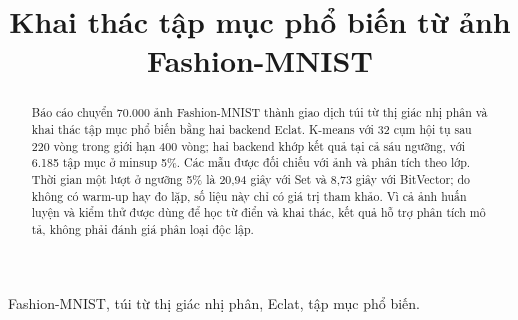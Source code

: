\documentclass[conference,a4paper]{IEEEtran}
\begin{document}
\raggedbottom
\title{Khai thác tập mục phổ biến từ ảnh Fashion-MNIST}
\author{
}
\maketitle

\begin{abstract}
Báo cáo chuyển 70.000 ảnh Fashion-MNIST thành giao dịch túi từ thị giác
nhị phân và khai thác tập mục phổ biến bằng hai backend Eclat. K-means
với 32 cụm hội tụ sau 220 vòng trong giới hạn 400 vòng; hai backend
khớp kết quả tại cả sáu ngưỡng, với 6.185 tập mục ở minsup 5\%. Các mẫu
được đối chiếu với ảnh và phân tích theo lớp. Thời gian một lượt ở
ngưỡng 5\% là 20,94 giây với Set và 8,73 giây với BitVector; do không
có warm-up hay đo lặp, số liệu này chỉ có giá trị tham khảo. Vì cả ảnh
huấn luyện và kiểm thử được dùng để học từ điển và khai thác, kết quả
hỗ trợ phân tích mô tả, không phải đánh giá phân loại độc lập.
\end{abstract}

\begin{IEEEkeywords}
Fashion-MNIST, túi từ thị giác nhị phân, Eclat, tập mục phổ biến.
\end{IEEEkeywords}

\setcounter{section}{2}



\end{document}
